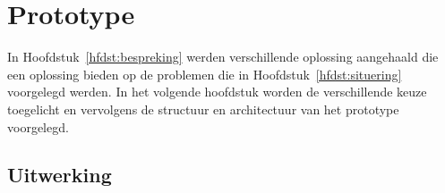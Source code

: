 \chapter{Prototype}
In Hoofdstuk~\vref{hfdst:bespreking} werden verschillende oplossing aangehaald die een oplossing bieden op de problemen die in Hoofdstuk~\vref{hfdst:situering} voorgelegd werden.
In het volgende hoofdstuk worden de verschillende keuze toegelicht en vervolgens de structuur en architectuur van het prototype voorgelegd.

\section{Uitwerking}

